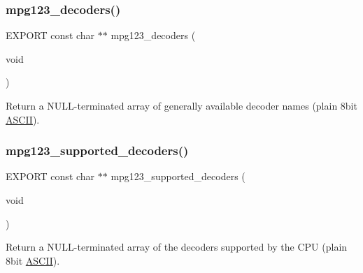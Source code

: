\subsubsection{\texorpdfstring{mpg123\+\_\+decoders()}{mpg123\_decoders()}}
{\footnotesize\ttfamily E\+X\+P\+O\+RT const char $\ast$$\ast$ mpg123\+\_\+decoders (\begin{DoxyParamCaption}\item[{void}]{ }\end{DoxyParamCaption})}

Return a N\+U\+L\+L-\/terminated array of generally available decoder names (plain 8bit \hyperlink{structASCII}{A\+S\+C\+II}). \mbox{\label{group__mpg123__decoder_ga73a5e970f8ab6b12778e5959373721d8}} 
\subsubsection{\texorpdfstring{mpg123\+\_\+supported\+\_\+decoders()}{mpg123\_supported\_decoders()}}
{\footnotesize\ttfamily E\+X\+P\+O\+RT const char $\ast$$\ast$ mpg123\+\_\+supported\+\_\+decoders (\begin{DoxyParamCaption}\item[{void}]{ }\end{DoxyParamCaption})}

Return a N\+U\+L\+L-\/terminated array of the decoders supported by the C\+PU (plain 8bit \hyperlink{structASCII}{A\+S\+C\+II}). 